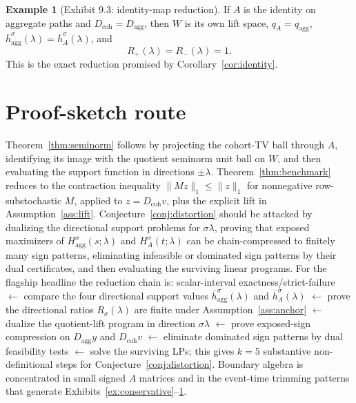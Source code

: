 \documentclass[11pt]{article}
\theoremstyle{definition}
\newtheorem{example}{Example}
\theoremstyle{plain}
\theoremstyle{remark}
\begin{document}
\begin{example}[Exhibit 9.3: identity-map reduction]\label{ex:identity}
If \(A\) is the identity on aggregate paths and \(D_{\mathrm{coh}}=D_{\mathrm{agg}}\), then \(W\) is its own lift space, \(q_A=q_{\mathrm{agg}}\), \(\bar h_{\mathrm{agg}}^\sigma(\lambda)=\bar h_A^\sigma(\lambda)\), and
\[
R_+(\lambda)=R_-(\lambda)=1.
\]
This is the exact reduction promised by Corollary~\ref{cor:identity}.
\end{example}

\section{Proof-sketch route}
Theorem~\ref{thm:seminorm} follows by projecting the cohort-TV ball through \(A\), identifying its image with the quotient seminorm unit ball on \(W\), and then evaluating the support function in directions \(\pm\lambda\). Theorem~\ref{thm:benchmark} reduces to the contraction inequality \(\|M z\|_1\le \|z\|_1\) for nonnegative row-substochastic \(M\), applied to \(z=D_{\mathrm{coh}}v\), plus the explicit lift in Assumption~\ref{ass:lift}. Conjecture~\ref{conj:distortion} should be attacked by dualizing the directional support problems for \(\sigma\lambda\), proving that exposed maximizers of \(H_{\mathrm{agg}}^\sigma(s;\lambda)\) and \(H_A^\sigma(t;\lambda)\) can be chain-compressed to finitely many sign patterns, eliminating infeasible or dominated sign patterns by their dual certificates, and then evaluating the surviving linear programs. For the flagship headline the reduction chain is: scalar-interval exactness/strict-failure \(\leftarrow\) compare the four directional support values \(\bar h_{\mathrm{agg}}^\sigma(\lambda)\) and \(\bar h_A^\sigma(\lambda)\) \(\leftarrow\) prove the directional ratios \(R_\sigma(\lambda)\) are finite under Assumption~\ref{ass:anchor} \(\leftarrow\) dualize the quotient-lift program in direction \(\sigma\lambda\) \(\leftarrow\) prove exposed-sign compression on \(D_{\mathrm{agg}}y\) and \(D_{\mathrm{coh}}v\) \(\leftarrow\) eliminate dominated sign patterns by dual feasibility tests \(\leftarrow\) solve the surviving LPs; this gives \(k=5\) substantive non-definitional steps for Conjecture~\ref{conj:distortion}. Boundary algebra is concentrated in small signed \(A\) matrices and in the event-time trimming patterns that generate Exhibits~\ref{ex:conservative}--\ref{ex:identity}.
\end{document}
